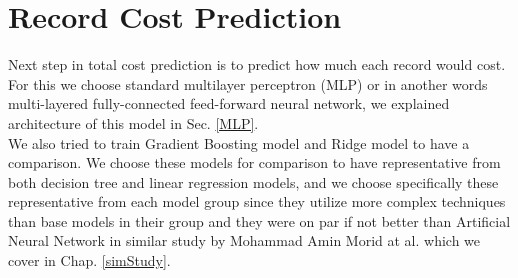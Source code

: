 
\section{Record Cost Prediction}
\label{recCostPred}

Next step in total cost prediction is to predict how much each record would cost. For this we choose standard multilayer perceptron (MLP) or in another words multi-layered fully-connected feed-forward neural network, we explained architecture of this model in Sec. \ref{MLP}. 
\\

We also tried to train Gradient Boosting model and Ridge model to have a comparison. We choose these models for comparison to have representative from both decision tree and linear regression models, and we choose specifically these representative from each model group since they utilize more complex techniques than base models in their group and they were on par if not better than Artificial Neural Network in similar study by Mohammad Amin Morid at al. \cite{morid2018supervised} which we cover in Chap. \ref{simStudy}.